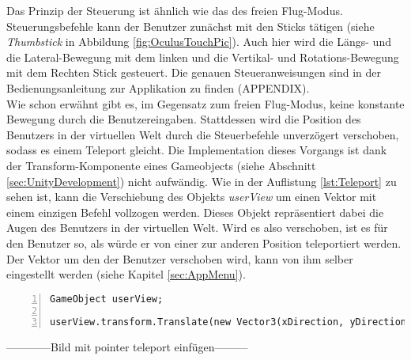 Das Prinzip der Steuerung ist ähnlich wie das des freien Flug-Modus. Steuerungsbefehle kann der Benutzer zunächst mit den Sticks tätigen (siehe \textit{Thumbstick} in Abbildung \ref{fig:OculusTouchPic}). Auch hier wird die Längs- und die Lateral-Bewegung mit dem linken und die Vertikal- und Rotations-Bewegung mit dem Rechten Stick gesteuert. Die genauen Steueranweisungen sind in der Bedienungsanleitung zur Applikation zu finden (APPENDIX).\\

Wie schon erwähnt gibt es, im Gegensatz zum freien Flug-Modus, keine konstante Bewegung durch die Benutzereingaben. Stattdessen wird die Position des Benutzers in der virtuellen Welt durch die Steuerbefehle unverzögert verschoben, sodass es einem Teleport gleicht. Die Implementation dieses Vorgangs ist dank der Transform-Komponente eines Gameobjects (siehe Abschnitt \ref{sec:UnityDevelopment}) nicht aufwändig. Wie in der Auflistung \ref{lst:Teleport} zu sehen ist, kann die Verschiebung des Objekts \textit{userView} um einen Vektor mit einem einzigen Befehl vollzogen werden. Dieses Objekt repräsentiert dabei die Augen des Benutzers in der virtuellen Welt. Wird es also verschoben, ist es für den Benutzer so, als würde er von einer zur anderen Position teleportiert werden. Der Vektor um den der Benutzer verschoben wird, kann von ihm selber eingestellt werden (siehe Kapitel \ref{sec:AppMenu}).

\begin{lstlisting}[caption={Implementierung des Teleportationsbefehls}, captionpos=t, numbers=left, label=lst:Teleport]
GameObject userView;

userView.transform.Translate(new Vector3(xDirection, yDirection, zDirection));
\end{lstlisting}
\quad

------------Bild mit pointer teleport einfügen---------

